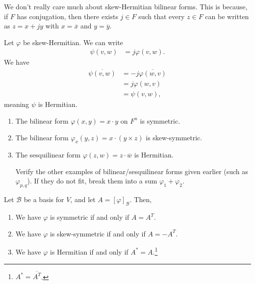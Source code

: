 \documentclass[10pt]{mypackage}
\begin{document}
  We don't really care much about skew-Hermitian bilinear forms. This is because, if $F$ has conjugation, then there exists $j\in F$ such that every $z\in F$ can be written as $z = x + jy$ with $x = \overline{x}$ and $y = \overline{y}$.\newline

  Let $\varphi$ be skew-Hermitian. We can write
  \begin{align*}
    \psi\left(v,w\right) &= j\varphi\left(v,w\right).
  \end{align*}
  We have
  \begin{align*}
    \overline{\psi\left(v,w\right)} &= -j\overline{\varphi\left(w,v\right)}\\
                                    &= j\varphi\left(w,v\right)\\
                                    &= \psi\left(v,w\right),
  \end{align*}
  meaning $\psi$ is Hermitian.
  \begin{example}\hfill
    \begin{enumerate}[(1)]
      \item The bilinear form $\varphi\left(x,y\right) = x\cdot y$ on $F^n$ is symmetric.
      \item The bilinear form $\varphi_x\left(y,z\right) = x\cdot \left(y\times z\right)$ is skew-symmetric.
      \item The sesquilinear form $\varphi\left(z,w\right) = z\cdot \overline{w}$ is Hermitian.
        \begin{exercise}
          Verify the other examples of bilinear/sesquilinear forms given earlier (such as $\varphi_{p,q}$). If they do not fit, break them into a sum $\varphi_1 + \varphi_2$.
        \end{exercise}
    \end{enumerate}
  \end{example}
  \begin{lemma}
    Let $\mathcal{B}$ be a basis for $V$, and let $A = \left[\varphi\right]_{\mathcal{B}}$. Then,
    \begin{enumerate}[(1)]
      \item We have $\varphi$ is symmetric if and only if $A = A^{T}$.
      \item We have $\varphi$ is skew-symmetric if and only if $A = -A^{T}$.
      \item We have $\varphi$ is Hermitian if and only if $A^{\ast} = A$.\footnote{$A^{\ast} = \overline{A^{T}}$.}
    \end{enumerate}
  \end{lemma}
\end{document}
